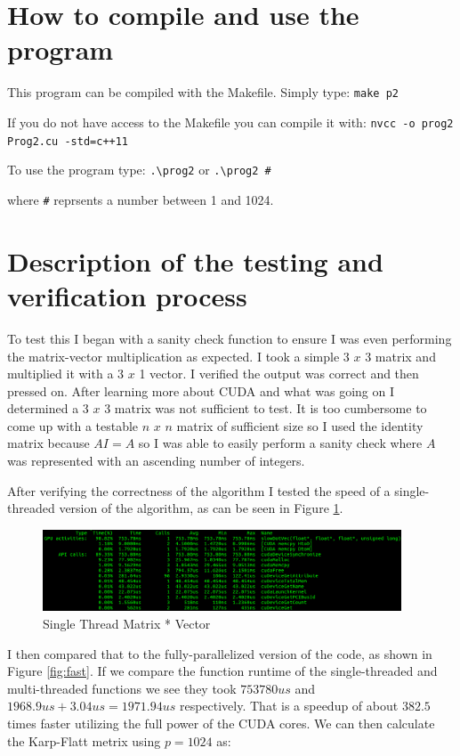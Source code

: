\documentclass{article}
\begin{document}
\section{How to compile and use the program}
This program can be compiled with the Makefile. Simply type: \texttt{make p2}

\noindent If you do not have access to the Makefile you can compile it with:
\verb|nvcc -o prog2 Prog2.cu -std=c++11|

\noindent To use the program type: \verb|.\prog2| or \verb|.\prog2 #| 

\noindent where \verb|#| reprsents a number between 1 and 1024.

\newpage
\section{Description of the testing and verification process}{\label{sec:test}}
To test this I began with a sanity check function to ensure I was even 
performing the matrix-vector multiplication as expected. I took a simple 3 $x$ 3 
matrix and multiplied it with a 3 $x$ 1 vector. I verified the output was correct 
and then pressed on. After learning more about CUDA and what was going on I 
determined a 3 $x$ 3 matrix was not sufficient to test. It is too cumbersome to 
come up with a testable $n$ $x$ $n$ matrix of sufficient size so I used the identity 
matrix because $AI = A$ so I was able to easily perform a sanity check where $A$ 
was represented with an ascending number of integers. 

After verifying the correctness of the algorithm I tested the speed of a 
single-threaded version of the algorithm, as can be seen in Figure \ref{fig:slow}.

\begin{figure}[h]
    \centering
    \includegraphics[width=0.95\textwidth]{slow}
    \caption{Single Thread Matrix * Vector}
    \label{fig:slow}
\end{figure}

I then compared that to the fully-parallelized version of the code, as shown in 
Figure \ref{fig:fast}. If we compare the function runtime of the single-threaded 
and multi-threaded functions we see they took $753780us$ and 
$1968.9us + 3.04us = 1971.94us$ respectively. That is a speedup of about $382.5$ 
times faster utilizing the full power of the CUDA cores. We can then calculate 
the Karp-Flatt metrix using $p=1024$ as:
\end{document}
